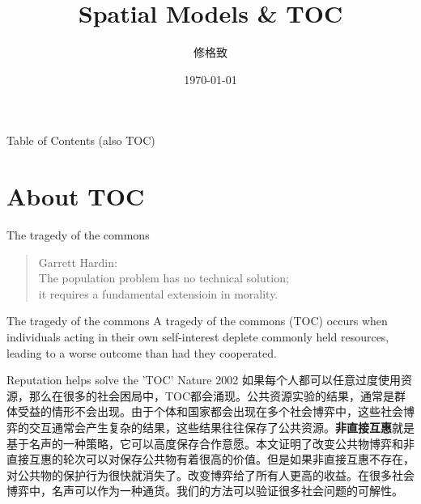 \documentclass{beamer}
\title{Spatial Models \& TOC}
\author{修格致}
\date{\today}
\institute{IRSGIS\\Peking U}
\begin{document}
    
\maketitle

\begin{frame}{Table of Contents (also TOC)}
    \tableofcontents    
\end{frame}

\section{About TOC}

\begin{frame}{The tragedy of the commons}
    \begin{quote}{Garrett Hardin:}
        \vspace{0.5cm}
\\        The population problem has no technical solution;\\
        it requires a fundamental extensioin in morality.
    \end{quote}
\end{frame}

\begin{frame}{The tragedy of the commons}
    A tragedy of the commons (TOC) occurs when individuals acting in their own self-interest deplete commonly held resources, leading to a worse outcome than had they cooperated.
\end{frame}

\begin{frame}{Reputation helps solve the 'TOC'}
    Nature 2002
    如果每个人都可以任意过度使用资源，那么在很多的社会困局中，TOC都会涌现。公共资源实验的结果，通常是群体受益的情形不会出现。由于个体和国家都会出现在多个社会博弈中，这些社会博弈的交互通常会产生复杂的结果，这些结果往往保存了公共资源。\textbf{非直接互惠}就是基于名声的一种策略，它可以高度保存合作意愿。本文证明了改变公共物博弈和非直接互惠的轮次可以对保存公共物有着很高的价值。但是如果非直接互惠不存在，对公共物的保护行为很快就消失了。改变博弈给了所有人更高的收益。在很多社会博弈中，名声可以作为一种通货。我们的方法可以验证很多社会问题的可解性。
\end{frame}
\end{document}
